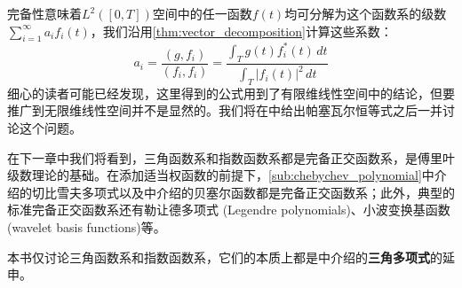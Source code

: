 完备性意味着$L^2([0,T])$空间中的任一函数$f(t)$均可分解为这个函数系的级数$\sum_{i = 1}^{\infty}  a_i f_i(t)$，我们沿用\cref{thm:vector_decomposition}计算这些系数：
\[a_i=\frac{(g,f_i)}{(f_i,f_i)}=\frac{\int_{T}g(t)f_i^*(t)\,dt}{\int_{T}|f_i(t)|^2\,dt}\]
细心的读者可能已经发现，这里得到的公式用到了有限维线性空间中的结论，但要推广到无限维线性空间并不是显然的。我们将在中给出帕塞瓦尔恒等式之后一并讨论这个问题。

在下一章中我们将看到，三角函数系和指数函数系都是完备正交函数系，是傅里叶级数理论的基础。在添加适当权函数的前提下，\ref{sub:chebychev_polynomial}中介绍的切比雪夫多项式以及中介绍的贝塞尔函数都是完备正交函数系；此外，典型的标准完备正交函数系还有勒让德多项式 (Legendre polynomials)、小波变换基函数 (wavelet basis functions)等。

本书仅讨论三角函数系和指数函数系，它们的本质上都是中介绍的\textbf{三角多项式}的延申。

